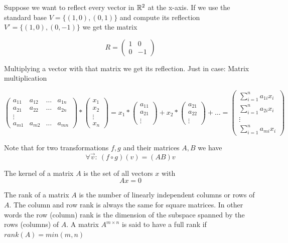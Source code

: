 \begin{Ex}[Reflection] Suppose we want to reflect every vector in $\mathbb{R}^2$ at the x-axis. If we use the standard base $V = \{(1,0),(0,1)\}$ and compute its reflection $V'=\{(1,0),(0,-1)\}$ we get the matrix

\[R = \begin{pmatrix}
1 & 0 \\
0 & -1
\end{pmatrix}\]

Multiplying a vector with that matrix we get its reflection. Just in case: Matrix multiplication

\[\begin{pmatrix}
a_{11} & a_{12} & \ldots & a_{1n}\\
a_{21} & a_{22} & \ldots & a_{2n}\\
\vdots \\
a_{m1} & a_{m2} & \ldots & a_{mn}
\end{pmatrix} * \begin{pmatrix}x_1\\x_2\\\vdots\\x_n\end{pmatrix} =x_1*\begin{pmatrix} a_{11}\\a_{21}\\\vdots\end{pmatrix} + x_2 *\begin{pmatrix}a_{21}\\a_{22}\\\vdots\end{pmatrix}+\ldots = \begin{pmatrix} \sum_{i=1}^n a_{1i}x_i\\ \sum_{i=1}^n a_{2i}x_i\\\vdots\\\sum_{i=1}^n a_{mi}x_i\end{pmatrix}\]

\end{Ex}

Note that for two transformations $f,g$ and their matrices $A,B$ we have
\[\forall \vec v:\ (f\circ g)(v) = (AB)v\]

\begin{Def} 
 The kernel of a matrix $A$ is the set of all vectors $x$ with
$$Ax=0$$
\end{Def}

\begin{Def}
 The rank of a matrix $A$ is the number of linearly independent columns or rows of $A$. The column and row rank is always the same for square matrices. In other words the row (column) rank is the dimension of the subspace spanned by the rows (columns) of $A$. A matrix $A^{m \times n}$ is said to have a full rank if $rank(A)=min(m,n)$
\end{Def}

